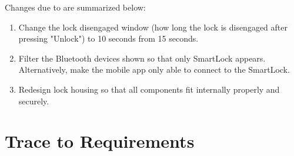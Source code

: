 \documentclass[12pt, titlepage]{article}
\begin{document}

Changes due to  are summarized below:

\begin{enumerate}
    \item Change the lock disengaged window (how long the lock is disengaged after pressing "Unlock") to 10 seconds from 15 seconds.
    \item Filter the Bluetooth devices shown so that only SmartLock appears. Alternatively, make the mobile app only able to connect to the SmartLock.
    \item Redesign lock housing so that all components fit internally properly and securely. 
\end{enumerate}
		
\section{Trace to Requirements}
\end{document}
